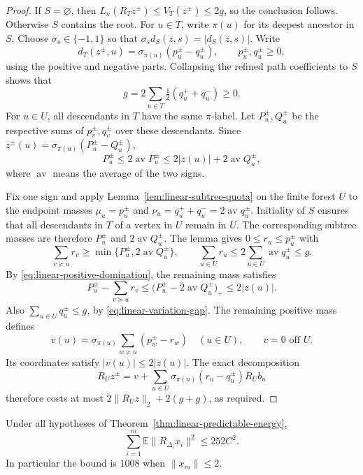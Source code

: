 \begin{proof}
If \(S=\varnothing\), then
\(L_n(R_Tz^\pm)\le V_T(z^\pm)\le2g\), so the conclusion follows.
Otherwise \(S\) contains the root.  For \(u\in T\), write \(\pi(u)\)
for its deepest ancestor in \(S\).  Choose
\(\sigma_s\in\{-1,1\}\) so that
\(\sigma_sd_S(z,s)=|d_S(z,s)|\).  Write
\[
 d_T(z^\pm,u)=\sigma_{\pi(u)}(p_u^\pm-q_u^\pm),
 \qquad p_u^\pm,q_u^\pm\ge0,
\]
using the positive and negative parts.  Collapsing the refined path
coefficients to \(S\) shows that
\begin{equation}\label{eq:linear-variation-gap}
 g=2\sum_{u\in T}\tfrac12(q_u^++q_u^-)\ge0.
\end{equation}
For \(u\in U\), all descendants in \(T\) have the same \(\pi\)-label.
Let \(P_u^\pm,Q_u^\pm\) be the respective sums of \(p_v^\pm,q_v^\pm\)
over these descendants.  Since
\(z^\pm(u)=\sigma_{\pi(u)}(P_u^\pm-Q_u^\pm)\),
\begin{equation}\label{eq:linear-positive-domination}
 P_u^\pm\le2\operatorname{av}P_u^\pm
 \le2|z(u)|+2\operatorname{av}Q_u^\pm,
\end{equation}
where \(\operatorname{av}\) means the average of the two signs.

Fix one sign and apply Lemma~\ref{lem:linear-subtree-quota} on the finite
forest \(U\) to the endpoint masses \(\mu_u=p_u^\pm\) and
\(\nu_u=q_u^++q_u^-=2\operatorname{av}q_u^\pm\). Initiality of \(S\)
ensures that all descendants in \(T\) of a vertex in \(U\) remain in
\(U\). The corresponding subtree masses are therefore
\(P_u^\pm\) and \(2\operatorname{av}Q_u^\pm\). The lemma gives
\(0\le r_u\le p_u^\pm\) with
\[
 \sum_{v\succeq u}r_v
 \ge\min\{P_u^\pm,2\operatorname{av}Q_u^\pm\},
 \qquad
 \sum_{u\in U}r_u\le2\sum_{u\in U}\operatorname{av}q_u^\pm\le g.
\]
By \eqref{eq:linear-positive-domination}, the remaining mass satisfies
\[
 P_u^\pm-\sum_{v\succeq u}r_v
 \le\bigl(P_u^\pm-2\operatorname{av}Q_u^\pm\bigr)_+
 \le2|z(u)|.
\]
Also \(\sum_{u\in U}q_u^\pm\le g\), by
\eqref{eq:linear-variation-gap}.  The remaining positive mass defines
\[
 v(u)=\sigma_{\pi(u)}\sum_{w\succeq u}(p_w^\pm-r_w)
 \quad(u\in U),\qquad v=0\text{ off }U.
\]
Its coordinates satisfy \(|v(u)|\le2|z(u)|\).  The exact decomposition
\[
 R_Uz^\pm=v+\sum_{u\in U}\sigma_{\pi(u)}(r_u-q_u^\pm)R_Ub_u
\]
therefore costs at most \(2\|R_Uz\|_2+2(g+g)\), as required.
\end{proof}

\begin{theorem}\label{thm:linear-variation-energy}
Under all hypotheses of
Theorem~\ref{thm:linear-predictable-energy},
\begin{equation}\label{eq:linear-energy-252}
 \sum_{i=1}^m\mathbb E\|R_{\Delta_i}x_i\|^2\le252C^2.
\end{equation}
In particular the bound is \(1008\) when \(\|x_m\|\le2\).
\end{theorem}

